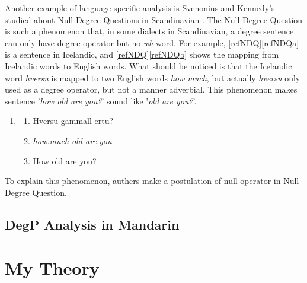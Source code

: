 \documentclass{ctexart}
\let \cite \parencite
\begin{document}
Another example of language-specific analysis is Svenonius and Kennedy's studied about Null Degree Questions in Scandinavian \cite{svenonius2006}. The Null Degree Question is such a phenomenon that, in some dialects in Scandinavian, a degree sentence can only have degree operator but no \textit{wh}-word. For example, \ref{refNDQ}\ref{refNDQa} is a sentence in Icelandic, and \ref{refNDQ}\ref{refNDQb} shows the mapping from Icelandic words to English words. What should be noticed is that the Icelandic word \textit{hversu} is mapped to two English words \textit{how much}, but actually \textit{hversu} only used as a degree operator, but not a manner adverbial. This phenomenon makes sentence '\textit{how old are you?}' sound like '\textit{old are you?}'.

\begin{enumerate}[resume]
\item \label{refNDQ}
\begin{enumerate}
\item \label{refNDQa} Hversu gammall ertu? 
\item \label{refNDQb} \textit{how.much old are.you}
\item \label{refNDQc} How old are you?
\end{enumerate}
\end{enumerate}

To explain this phenomenon, authers make a postulation of null operator in Null Degree Question. 


\subsection{DegP Analysis in Mandarin}

\section{My Theory}

\newpage

\printbibliography
\end{document}
